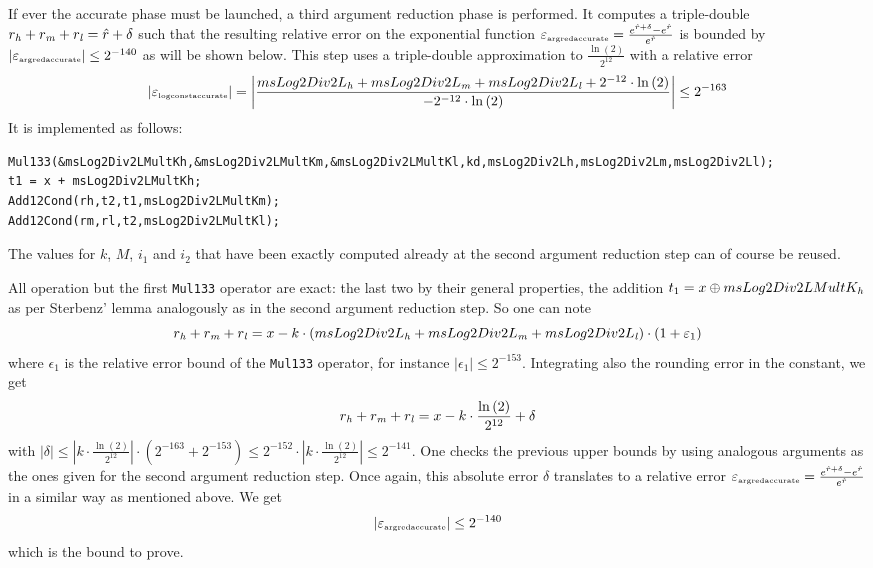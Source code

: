If ever the accurate phase must be launched, a third argument
reduction phase is performed.  It computes a triple-double $r_\hi +
r_\mi + r_\lo = \hat{r} + \delta$ such that the resulting relative
error on the exponential function $\epsilon_{\mbox{\tiny
argredaccurate}} = \frac{e^{\hat{r} + \delta} -
e^{\hat{r}}}{e^{\hat{r}}}$ is bounded by $\left \vert
\epsilon_{\mbox{\tiny argredaccurate}} \right \vert \leq 2^{-140}$ as
will be shown below. This step uses a triple-double approximation to
$\frac{\ln\left( 2 \right)}{2^{12}}$ with a relative error $$\left
\vert \epsilon_{\mbox{\tiny logconstaccurate}} \right \vert = \left
\vert \frac{msLog2Div2L_\hi + msLog2Div2L_\mi + msLog2Div2L_\lo +
2^{-12} \cdot \ln\left( 2 \right)}{-2^{-12} \cdot \ln\left( 2 \right)}
\right \vert \leq 2^{-163}$$ It is implemented as follows:
\begin{lstlisting}[caption={Argument reduction - third step},firstnumber=1]
Mul133(&msLog2Div2LMultKh,&msLog2Div2LMultKm,&msLog2Div2LMultKl,kd,msLog2Div2Lh,msLog2Div2Lm,msLog2Div2Ll);
t1 = x + msLog2Div2LMultKh;
Add12Cond(rh,t2,t1,msLog2Div2LMultKm);
Add12Cond(rm,rl,t2,msLog2Div2LMultKl);
\end{lstlisting}
The values for $k$, $M$, $i_1$ and $i_2$ that have been exactly
computed already at the second argument reduction step can of course
be reused.

All operation but the first \texttt{Mul133} operator are exact: the
last two by their general properties, the addition $t_1 = x \oplus
msLog2Div2LMultK_\hi$ as per Sterbenz' lemma analogously as in the
second argument reduction step. So one can note
$$r_\hi + r_\mi + r_\lo = x - k \cdot \left( msLog2Div2L_\hi +
msLog2Div2L_\mi + msLog2Div2L_\lo \right) \cdot \left( 1 + \epsilon_1
\right)$$ where $\epsilon_1$ is the relative error bound of the
\texttt{Mul133} operator, for instance $\left \vert \epsilon_1 \right
\vert \leq 2^{-153}$. Integrating also the rounding error in the constant, we
get 
$$r_\hi + r_\mi + r_\lo = x - k \cdot \frac{\ln\left( 2
\right)}{2^{12}} + \delta$$ with $\left \vert \delta \right \vert \leq
\left \vert k \cdot \frac{\ln\left( 2 \right)}{2^{12}} \right \vert
\cdot \left( 2^{-163} + 2^{-153} \right) \leq 2^{-152} \cdot \left
\vert k \cdot \frac{\ln\left( 2 \right)}{2^{12}} \right \vert \leq
2^{-141}$.  One checks the previous upper bounds by using analogous
arguments as the ones given for the second argument reduction step.
Once again, this absolute error $\delta$ translates to a relative
error $\epsilon_{\mbox{\tiny argredaccurate}} = \frac{e^{\hat{r} +
\delta} - e^{\hat{r}}}{e^{\hat{r}}}$ in a similar way as mentioned
above. We get $$\left \vert \epsilon_{\mbox{\tiny argredaccurate}}
\right \vert \leq 2^{-140}$$ which is the bound to prove.

